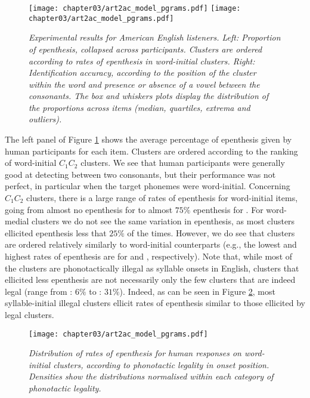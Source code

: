 {\begin{figure}[htb!]
  \centering
    \texttt{[image: chapter03/art2ac\_model\_pgrams.pdf]}%
    \hspace{0.5cm}
    \texttt{[image: chapter03/art2ac\_model\_pgrams.pdf]}
    \caption{\textit{Experimental results for American English listeners.
      Left: Proportion of epenthesis, collapsed across participants. Clusters are ordered according to rates of epenthesis in word-initial clusters. 
      Right: Identification accuracy, according to the position of the cluster within the word and presence or absence of a vowel between the consonants. The box and whiskers plots display the distribution of the proportions across items (median, quartiles, extrema and outliers).}}
    \label{fig:wpd-hum}
  \end{figure}

The left panel of Figure \ref{fig:wpd-hum} shows the average percentage of epenthesis given by human participants for each item. Clusters are ordered according to the ranking of word-initial $C_{1}C_{2}$ clusters. We see that human participants were generally good at detecting \textipa{[@]} between two consonants, but their performance was not perfect, in particular when the target phonemes were word-initial. Concerning $C_{1}C_{2}$ clusters, there is a large range of rates of epenthesis for word-initial items, going from almost no epenthesis for  to almost $75\%$ epenthesis for . For word-medial clusters we do not see the same variation in epenthesis, as most clusters ellicited epenthesis less that $25\%$ of the times. However, we do see that clusters are ordered relatively similarly to word-initial counterparts (e.g., the lowest and highest rates of epenthesis are for  and , respectively). Note that, while most of the clusters are phonotactically illegal as syllable onsets in English, clusters that ellicited less epenthesis are not necessarily only the few clusters that are indeed legal (range from : $6\%$ to : $31\%$). Indeed, as can be seen in Figure \ref{fig:wpd-legal}, most syllable-initial illegal clusters ellicit rates of epenthesis similar to those ellicited by legal clusters. 

\begin{figure}[htb!]
  \centering
    \texttt{[image: chapter03/art2ac\_model\_pgrams.pdf]}    \caption{\textit{Distribution of rates of epenthesis for human responses on word-initial clusters, according to phonotactic legality in onset position. Densities show the distributions normalised within each category of phonotactic legality.}}
    \label{fig:wpd-legal}
  \end{figure}

}
